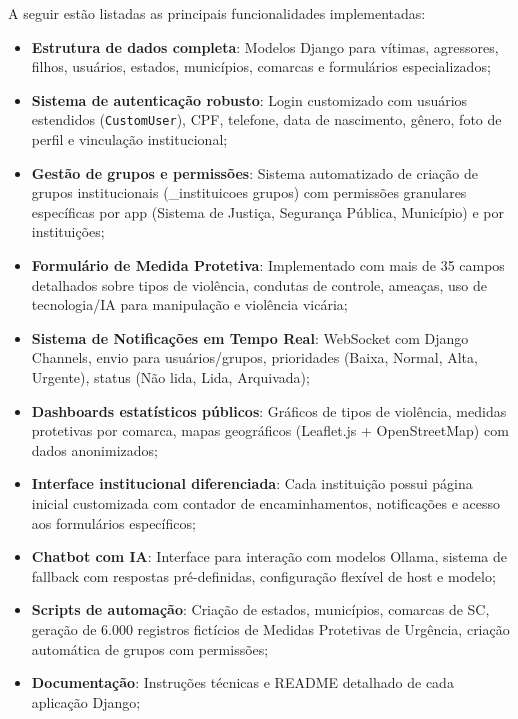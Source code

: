 A seguir estão listadas as principais funcionalidades implementadas:

\begin{itemize}
    \item \textbf{Estrutura de dados completa}: Modelos Django para vítimas, agressores, filhos, usuários, estados, municípios, comarcas e formulários especializados;
    
    \item \textbf{Sistema de autenticação robusto}: Login customizado com usuários estendidos (\texttt{CustomUser}), CPF, telefone, data de nascimento, gênero, foto de perfil e vinculação institucional;
    
    \item \textbf{Gestão de grupos e permissões}: Sistema automatizado de criação de grupos institucionais (\numero_instituicoes{} grupos) com permissões granulares específicas por app (Sistema de Justiça, Segurança Pública, Município) e por instituições;
    
    \item \textbf{Formulário de Medida Protetiva}: Implementado com mais de 35 campos detalhados sobre tipos de violência, condutas de controle, ameaças, uso de tecnologia/IA para manipulação e violência vicária;
    
    
    \item \textbf{Sistema de Notificações em Tempo Real}: WebSocket com Django Channels, envio para usuários/grupos, prioridades (Baixa, Normal, Alta, Urgente), status (Não lida, Lida, Arquivada);
    
    \item \textbf{Dashboards estatísticos públicos}: Gráficos de tipos de violência, medidas protetivas por comarca, mapas geográficos (Leaflet.js + OpenStreetMap) com dados anonimizados;
    
    \item \textbf{Interface institucional diferenciada}: Cada instituição possui página inicial customizada com contador de encaminhamentos, notificações e acesso aos formulários específicos;
    
    \item \textbf{Chatbot com IA}: Interface para interação com modelos Ollama, sistema de fallback com respostas pré-definidas, configuração flexível de host e modelo;
    
    \item \textbf{Scripts de automação}: Criação de estados, municípios, comarcas de SC, geração de 6.000 registros fictícios de Medidas Protetivas de Urgência, criação automática de grupos com permissões;
    
    \item \textbf{Documentação}: Instruções técnicas e README detalhado de cada aplicação Django;
    
   
\end{itemize}

